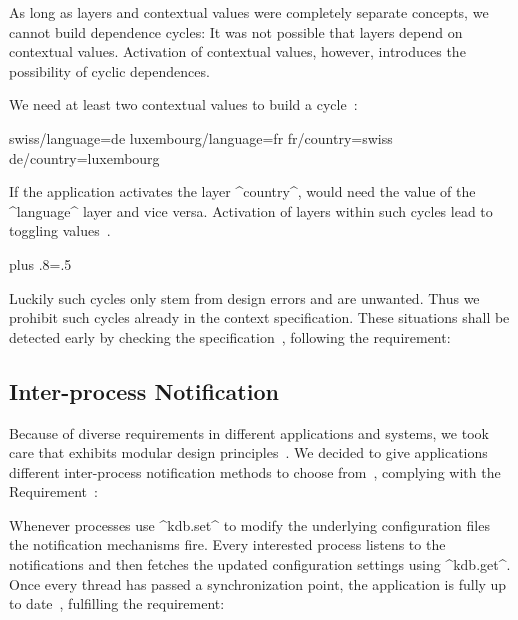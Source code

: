 As long as layers and contextual values were completely separate concepts, we cannot build dependence cycles:
It was not possible that layers depend on contextual values.
Activation of contextual values, however, introduces the possibility of cyclic dependences.

\begin{example}
We need at least two contextual values to build a cycle~\cite{raab2016persistent}:


swiss/language=de
luxembourg/language=fr
fr/country=swiss
de/country=luxembourg
\end{code}

If the application activates the layer ^country^, \elektra{} would need the value of the ^language^ layer and vice versa.
Activation of layers within such cycles lead to toggling values~\cite{raab2016persistent}.%
{\parfillskip=0pt plus .8\textwidth \emergencystretch=.5\textwidth \par}
\end{example}

Luckily such cycles only stem from design errors and are unwanted.
Thus we prohibit such cycles already in the context specification.
These situations shall be detected early by checking the specification~\cite{raab2016persistent}, following the requirement:
\reqGeneration*




\subsection{Inter-process Notification}
\label{sec:frontend-inter-process-notification}

Because of diverse requirements in different applications and systems, we took care that \elektra{} exhibits  modular design principles~\cite{raab2010thesis,raab2016improving}.
We decided to give applications different inter-process notification methods to choose from~\cite{raab2016persistent}, complying with the Requirement~:
\reqLegacy*


Whenever processes use ^kdb.set^ to modify the underlying configuration files the notification mechanisms fire.
Every interested process listens to the notifications and then fetches the updated configuration settings using ^kdb.get^.
Once every thread has passed a synchronization point, the application is fully up to date~\cite{raab2016persistent}, fulfilling the requirement:
\reqConsistency*


